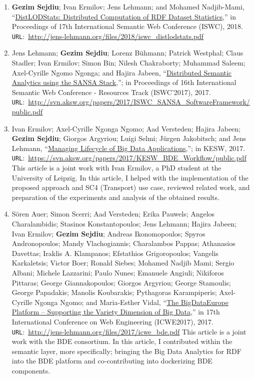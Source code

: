 \begin{itemize}
\begin{enumerate}
    \item \textbf{Gezim Sejdiu}; Ivan Ermilov; Jens Lehmann; and Mohamed Nadjib-Mami, “\href{http://jens-lehmann.org/files/2018/iswc_distlodstats.pdf}{DistLODStats: Distributed Computation of RDF Dataset Statistics},” in Proceedings of 17th International Semantic Web Conference (ISWC), 2018. \texttt{URL}:~\url{http://jens-lehmann.org/files/2018/iswc_distlodstats.pdf}

    \item Jens Lehmann; \textbf{Gezim Sejdiu}; Lorenz Bühmann; Patrick Westphal; Claus Stadler; Ivan Ermilov; Simon Bin; Nilesh Chakraborty; Muhammad Saleem; Axel-Cyrille Ngomo Ngonga; and Hajira Jabeen, “\href{http://svn.aksw.org/papers/2017/ISWC_SANSA_SoftwareFramework/public.pdf}{Distributed Semantic Analytics using the SANSA Stack},”; in Proceedings of 16th International Semantic Web Conference - Resources Track (ISWC’2017), 2017. \texttt{URL}:~\url{http://svn.aksw.org/papers/2017/ISWC_SANSA_SoftwareFramework/public.pdf}
    
    \item Ivan Ermilov; Axel-Cyrille Ngonga Ngomo; Aad Versteden; Hajira Jabeen; \textbf{Gezim Sejdiu}; Giorgos Argyriou; Luigi Selmi; Jürgen Jakobitsch; and Jens Lehmann, “\href{https://svn.aksw.org/papers/2017/KESW_BDE_Workflow/public.pdf}{Managing Lifecycle of Big Data Applications},”; in KESW, 2017. \texttt{URL}:~\url{https://svn.aksw.org/papers/2017/KESW_BDE_Workflow/public.pdf}
    This article is a joint work with Ivan Ermilov, a PhD student at the University of Leipzig. 
    In this article, I helped with the implementation of the proposed approach and SC4 (Transport) use case, reviewed related work, and preparation of the experiments and analysis of the obtained results.

    \item Sören Auer; Simon Scerri; Aad Versteden; Erika Pauwels; Angelos Charalambidis; Stasinos Konstantopoulos; Jens Lehmann; Hajira Jabeen; Ivan Ermilov; \textbf{Gezim Sejdiu}; Andreas Ikonomopoulos; Spyros Andronopoulos; Mandy Vlachogiannis; Charalambos Pappas; Athanasios Davettas; Iraklis A. Klampanos; Efstathios Grigoropoulos; Vangelis Karkaletsis; Victor Boer; Ronald Siebes; Mohamed Nadjib Mami; Sergio Albani; Michele Lazzarini; Paulo Nunes; Emanuele Angiuli; Nikiforos Pittaras; George Giannakopoulos; Giorgos Argyriou; George Stamoulis; George Papadakis; Manolis Koubarakis; Pythagoras Karampiperis; Axel-Cyrille Ngonga Ngomo; and Maria-Esther Vidal, “\href{http://jens-lehmann.org/files/2017/icwe_bde.pdf}{The BigDataEurope Platform – Supporting the Variety Dimension of Big Data},” in 17th International Conference on Web Engineering (ICWE2017), 2017. \texttt{URL}:~\url{http://jens-lehmann.org/files/2017/icwe_bde.pdf}
    This article is a joint work with the BDE consortium. 
    In this article, I contributed within the semantic layer, more specifically; bringing the Big Data Analytics for \gls{RDF} into the BDE platform and co-contributing into dockerizing BDE components.
     

\end{enumerate}
\end{itemize}
